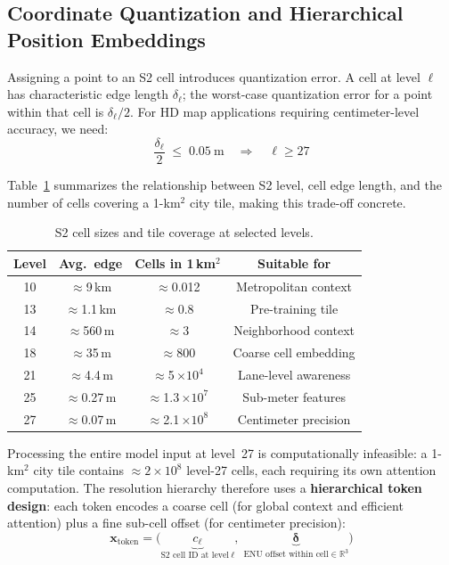 \documentclass{book}
\begin{document}
\subsection{Coordinate Quantization and Hierarchical Position Embeddings}
\label{sec:coord_quantization}

Assigning a point to an S2 cell introduces quantization error.
A cell at level $\ell$ has characteristic edge length $\delta_\ell$;
the worst-case quantization error for a point within that cell is
$\delta_\ell / 2$.
For HD map applications requiring centimeter-level accuracy, we need:
\begin{equation}
  \frac{\delta_\ell}{2} \;\leq\; 0.05\ \text{m}
  \quad\Rightarrow\quad \ell \geq 27
  \label{eq:precision_requirement}
\end{equation}

Table~\ref{tab:s2_levels_2} summarizes the relationship between S2
level, cell edge length, and the number of cells covering a
1-km$^2$ city tile, making this trade-off concrete.

\begin{table}[htbp]
\centering
\caption{S2 cell sizes and tile coverage at selected levels.}
\label{tab:s2_levels_2}
\begin{tabular}{cccc}
\hline
\textbf{Level} & \textbf{Avg.\ edge} & \textbf{Cells in 1\,km$^2$} & \textbf{Suitable for} \\
\hline
10 & $\approx$9\,km     & $\approx$0.012              & Metropolitan context   \\
13 & $\approx$1.1\,km   & $\approx$0.8                & Pre-training tile      \\
14 & $\approx$560\,m    & $\approx$3                  & Neighborhood context   \\
18 & $\approx$35\,m     & $\approx$800                & Coarse cell embedding  \\
21 & $\approx$4.4\,m    & $\approx$5\,$\times 10^4$   & Lane-level awareness   \\
25 & $\approx$0.27\,m   & $\approx$1.3\,$\times 10^7$ & Sub-meter features     \\
27 & $\approx$0.07\,m   & $\approx$2.1\,$\times 10^8$ & Centimeter precision   \\
\hline
\end{tabular}
\end{table}

Processing the entire model input at level~27 is computationally
infeasible: a 1-km$^2$ city tile contains $\approx 2 \times 10^8$
level-27 cells, each requiring its own attention computation.
The resolution hierarchy therefore uses a
\textbf{hierarchical token design}: each token encodes a coarse cell
(for global context and efficient attention) plus a fine sub-cell
offset (for centimeter precision):
\begin{equation}
  \mathbf{x}_{\text{token}} =
    \bigl(
      \underbrace{c_\ell}_{\text{S2 cell ID at level}\ \ell},\;
      \underbrace{\boldsymbol{\delta}}_{\text{ENU offset within cell}
        \in \mathbb{R}^3}
    \bigr)
  \label{eq:token_design}
\end{equation}
\end{document}
